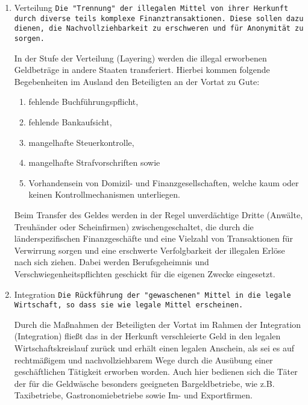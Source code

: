 \documentclass{article}
\begin{document}
\begin{enumerate}
\begin{enumerate}
                    \end{enumerate}

                    \item Verteilung
                        \texttt
                            {Die "Trennung" der illegalen Mittel von ihrer Herkunft durch diverse teils komplexe Finanztransaktionen. Diese sollen dazu dienen, die Nachvollziehbarkeit zu erschweren und für Anonymität zu sorgen.}
			
			         In der Stufe der Verteilung (Layering) werden die illegal erworbenen Geldbeträge in andere Staaten transferiert. Hierbei kommen folgende Begebenheiten im Ausland den Beteiligten an der Vortat zu Gute:
			
        		  	\begin{enumerate}
        				\item
        					fehlende Buchführungspflicht,
        				\item
        					fehlende Bankaufsicht,
        				\item
        					mangelhafte Steuerkontrolle,
        				\item
        					mangelhafte Strafvorschriften sowie
        				\item
        					Vorhandensein von Domizil- und Finanzgesellschaften, welche kaum oder keinen Kontrollmechanismen unterliegen.
        			\end{enumerate}
        			
			Beim Transfer des Geldes werden in der Regel unverdächtige Dritte (Anwälte, Treuhänder oder Scheinfirmen) zwischengeschaltet, die durch die länderspezifischen Finanzgeschäfte und eine Vielzahl von Transaktionen für Verwirrung sorgen und eine erschwerte Verfolgbarkeit der illegalen Erlöse nach sich ziehen. Dabei werden Berufsgeheimnis und Verschwiegenheitspflichten geschickt für die eigenen Zwecke eingesetzt.
	
                    \item Integration
			             \texttt {Die Rückführung der "gewaschenen" Mittel in die legale Wirtschaft, so dass sie wie legale Mittel erscheinen.}
			
			Durch die Maßnahmen der Beteiligten der Vortat im Rahmen der Integration (Integration) fließt das in der Herkunft verschleierte Geld in den legalen Wirtschaftskreislauf zurück und erhält einen legalen Anschein, als sei es auf rechtmäßigem und nachvollziehbarem Wege durch die Ausübung einer geschäftlichen Tätigkeit erworben worden. Auch hier bedienen sich die Täter der für die Geldwäsche besonders geeigneten Bargeldbetriebe, wie z.B. Taxibetriebe, Gastronomiebetriebe sowie Im- und Exportfirmen.


\end{enumerate}
\end{document}
